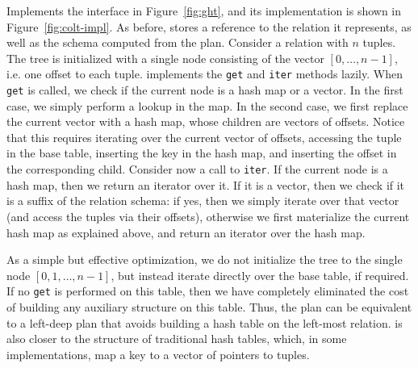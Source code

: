 \COLT Implements the \GHT interface in Figure~\ref{fig:ght}, and its
implementation is shown in Figure~\ref{fig:colt-impl}. As before,
\COLT stores a reference to the relation it represents, as well as the
\GHT schema computed from the plan.
Consider a relation with $n$ tuples.  The \COLT tree is initialized
with a single node consisting of the vector $[0, \ldots, n-1]$,
i.e. one offset to each tuple.  
\COLT
implements the \lstinline|get| and \lstinline|iter| methods lazily.  
When
\lstinline|get| is called, we check if the current node is a hash
map or a vector.  In the first case, we simply perform a lookup in the
map.  In the second case, we first replace the current vector with a
hash map, whose children are vectors of offsets.  Notice that this
requires iterating over the current vector of offsets, accessing the
tuple in the base table, inserting the key in the hash map, and
inserting the offset in the corresponding child.  Consider now a call
to \lstinline|iter|.  If the current node is a hash map, then we
return an iterator over it.  If it is a vector, then we check if it is
a suffix of the relation schema: if yes, then we simply iterate over
that vector (and access the tuples via their offsets), otherwise we
first materialize the current hash map as explained above, and return
an iterator over the hash map.

As a simple but effective optimization, we do not initialize the \COLT
tree to the single node $[0,1,\ldots,n-1]$, but instead iterate
directly over the base table, if required.  If no \lstinline|get|
is performed on this table, then we have completely eliminated the
cost of building any auxiliary structure on this table.  Thus, the \FJ
plan can be equivalent to a left-deep plan that avoids building a hash
table on the left-most relation.  \COLT is also closer to the structure of
traditional hash tables, which, in some implementations, map a key to
a vector of pointers to tuples.
%
%

